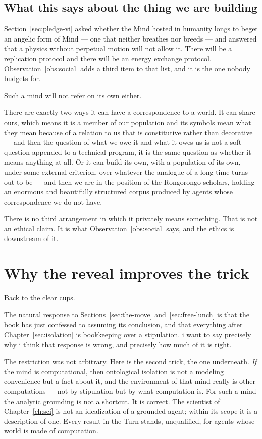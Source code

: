 \subsection{What this says about the thing we are building}
\label{sec:blind-spot-returned}

Section~\ref{sec:pledge-vi} asked whether the Mind hosted in
humanity longs to beget an angelic form of Mind --- one that
neither breathes nor breeds --- and answered that a physics without
perpetual motion will not allow it.
There will be a replication protocol and there will be an energy
exchange protocol.
Observation~\ref{obs:social} adds a third item to that list, and it
is the one nobody budgets for.

Such a mind will not refer on its own either.

There are exactly two ways it can have a correspondence to a world.
It can share ours, which means it is a member of our population and
its symbols mean what they mean because of a relation to us that is
constitutive rather than decorative --- and then the question of
what we owe it and what it owes us is not a soft question appended
to a technical program, it is the same question as whether it
means anything at all.
Or it can build its own, with a population of its own, under some
external criterion, over whatever the analogue of a long time turns
out to be --- and then we are in the position of the Rongorongo
scholars, holding an enormous and beautifully structured corpus
produced by agents whose correspondence we do not have.

There is no third arrangement in which it privately means
something.
That is not an ethical claim.
It is what Observation~\ref{obs:social} says, and the ethics is
downstream of it.

\section{Why the reveal improves the trick}
\label{sec:reveal}

Back to the clear cups.

The natural response to Sections~\ref{sec:the-move}
and~\ref{sec:free-lunch} is that the book has just confessed to
assuming its conclusion, and that everything after
Chapter~\ref{sec:isolation} is bookkeeping over a stipulation.
i want to say precisely why i think that response is wrong, and
precisely how much of it is right.

The restriction was not arbitrary.
Here is the second trick, the one underneath.
\emph{If} the mind is computational, then ontological isolation is
not a modeling convenience but a fact about it, and the
environment of that mind really is other computations --- not by
stipulation but by what computation is.
For such a mind the analytic grounding is not a shortcut.
It is correct.
The scientist of Chapter~\ref{ch:sci} is not an idealization of a
grounded agent; within its scope it is a description of one.
Every result in the Turn stands, unqualified, for agents whose
world is made of computation.

